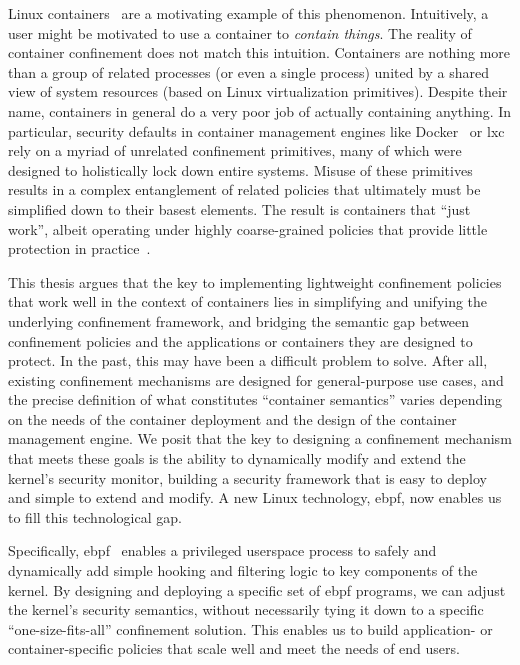 \documentclass[
  fontsize=12pt,
  titlepage=firstiscover,
  paper=letter,
oneside,
  cleardoublepage=plain,
  parskip=half-,
  DIV=10,
  parindent,
  appendixprefix,
  chapterprefix,
  listof=totoc,
]{scrbook}
\begin{document}
Linux containers~\cite{docker_security, lxc_security, lin2018_container_security,
sultan2019_container_security} are a motivating example of this phenomenon. Intuitively,
a user might be motivated to use a container to \textit{contain things}. The reality of
container confinement does not match this intuition. Containers are nothing more than
a group of related processes (or even a single process) united by a shared view of system
resources (based on Linux virtualization primitives). Despite their name, containers in
general do a very poor job of actually containing anything. In particular, security
defaults in container management engines like Docker~\cite{docker_security} or
\gls{lxc}~\cite{lxc_security} rely on a myriad of unrelated confinement primitives, many
of which were designed to holistically lock down entire systems. Misuse of these
primitives results in a complex entanglement of related policies that ultimately must be
simplified down to their basest elements. The result is containers that \enquote{just
work}, albeit operating under highly coarse-grained policies that provide little
protection in practice~\cite{sultan2019_container_security, lin2018_container_security}.

This thesis argues that the key to implementing lightweight confinement policies that
work well in the context of containers lies in simplifying and unifying the underlying
confinement framework, and bridging the semantic gap between confinement policies and the
applications or containers they are designed to protect. In the past, this may have been
a difficult problem to solve. After all, existing confinement mechanisms are designed for
general-purpose use cases, and the precise definition of what constitutes
\enquote{container semantics} varies depending on the needs of the container deployment
and the design of the container management engine. We posit that the key to designing
a confinement mechanism that meets these goals is the ability to dynamically modify and
extend the kernel's security monitor, building a security framework that is easy to deploy
and simple to extend and modify. A new Linux technology, \gls{ebpf}, now enables us to
fill this technological gap.

Specifically, \gls{ebpf}~\cite{gregg2019_bpf, starovoitov2014_ebpf} enables a privileged
userspace process to safely and dynamically add simple hooking and filtering logic to key
components of the kernel. By designing and deploying a specific set of \gls{ebpf}
programs, we can adjust the kernel's security semantics, without necessarily tying it down
to a specific \enquote{one-size-fits-all} confinement solution. This enables us to build
application- or container-specific policies that scale well and meet the needs of
end users.
\end{document}
